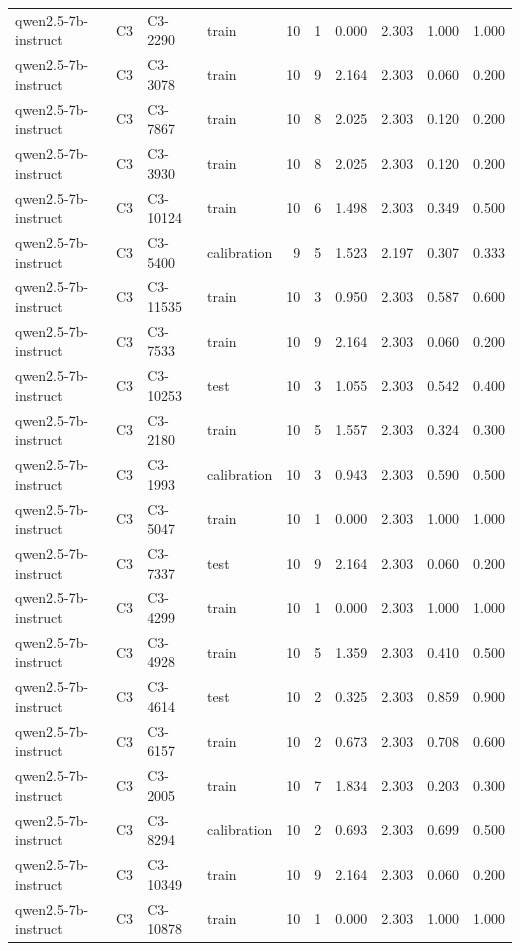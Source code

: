 \begin{table}
\begin{tabular}{llllrrrrrr}
qwen2.5-7b-instruct & C3 & C3-2290 & train & 10 & 1 & 0.000 & 2.303 & 1.000 & 1.000 \\
qwen2.5-7b-instruct & C3 & C3-3078 & train & 10 & 9 & 2.164 & 2.303 & 0.060 & 0.200 \\
qwen2.5-7b-instruct & C3 & C3-7867 & train & 10 & 8 & 2.025 & 2.303 & 0.120 & 0.200 \\
qwen2.5-7b-instruct & C3 & C3-3930 & train & 10 & 8 & 2.025 & 2.303 & 0.120 & 0.200 \\
qwen2.5-7b-instruct & C3 & C3-10124 & train & 10 & 6 & 1.498 & 2.303 & 0.349 & 0.500 \\
qwen2.5-7b-instruct & C3 & C3-5400 & calibration & 9 & 5 & 1.523 & 2.197 & 0.307 & 0.333 \\
qwen2.5-7b-instruct & C3 & C3-11535 & train & 10 & 3 & 0.950 & 2.303 & 0.587 & 0.600 \\
qwen2.5-7b-instruct & C3 & C3-7533 & train & 10 & 9 & 2.164 & 2.303 & 0.060 & 0.200 \\
qwen2.5-7b-instruct & C3 & C3-10253 & test & 10 & 3 & 1.055 & 2.303 & 0.542 & 0.400 \\
qwen2.5-7b-instruct & C3 & C3-2180 & train & 10 & 5 & 1.557 & 2.303 & 0.324 & 0.300 \\
qwen2.5-7b-instruct & C3 & C3-1993 & calibration & 10 & 3 & 0.943 & 2.303 & 0.590 & 0.500 \\
qwen2.5-7b-instruct & C3 & C3-5047 & train & 10 & 1 & 0.000 & 2.303 & 1.000 & 1.000 \\
qwen2.5-7b-instruct & C3 & C3-7337 & test & 10 & 9 & 2.164 & 2.303 & 0.060 & 0.200 \\
qwen2.5-7b-instruct & C3 & C3-4299 & train & 10 & 1 & 0.000 & 2.303 & 1.000 & 1.000 \\
qwen2.5-7b-instruct & C3 & C3-4928 & train & 10 & 5 & 1.359 & 2.303 & 0.410 & 0.500 \\
qwen2.5-7b-instruct & C3 & C3-4614 & test & 10 & 2 & 0.325 & 2.303 & 0.859 & 0.900 \\
qwen2.5-7b-instruct & C3 & C3-6157 & train & 10 & 2 & 0.673 & 2.303 & 0.708 & 0.600 \\
qwen2.5-7b-instruct & C3 & C3-2005 & train & 10 & 7 & 1.834 & 2.303 & 0.203 & 0.300 \\
qwen2.5-7b-instruct & C3 & C3-8294 & calibration & 10 & 2 & 0.693 & 2.303 & 0.699 & 0.500 \\
qwen2.5-7b-instruct & C3 & C3-10349 & train & 10 & 9 & 2.164 & 2.303 & 0.060 & 0.200 \\
qwen2.5-7b-instruct & C3 & C3-10878 & train & 10 & 1 & 0.000 & 2.303 & 1.000 & 1.000 \\

\end{tabular}
\end{table}
